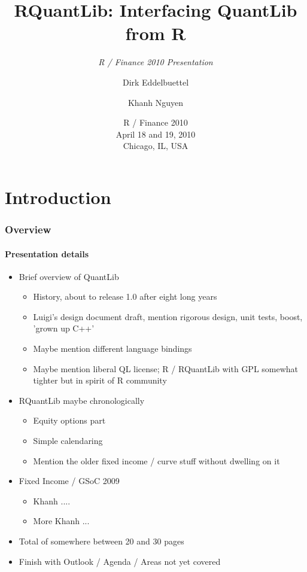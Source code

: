 \documentclass[smaller,compress, 9pt]{beamer}
\title[RQuantLib]{RQuantLib: Interfacing QuantLib from R}  %
\subtitle{\textsl{R / Finance 2010 Presentation}}
\author[Eddelbuettel \and Nguyen]{Dirk Eddelbuettel\inst{1} \and Khanh Nguyen\inst{2}}
\institute[Debian and UMASS]{
  \inst{1}%
  Debian Project
  \and 
  \inst{2}
  UMASS at Boston
}
\date[R / Finance 2010]{R / Finance 2010 \\ April 18 and 19, 2010 \\ Chicago, IL, USA}
\begin{document}
\begin{frame}
  \titlepage
\end{frame}

\section{Introduction}
\begin{frame}
  \frametitle{Overview}
  \framesubtitle{Presentation details}
  \begin{itemize}
  \item Brief overview of QuantLib
    \begin{itemize}
    \item History, about to release 1.0 after eight long years
    \item Luigi's design document draft, mention rigorous design, unit
      tests, boost, 'grown up C++'
    \item Maybe mention different language bindings
    \item Maybe mention liberal QL license; R / RQuantLib with GPL somewhat
      tighter but in spirit of R community
    \end{itemize}
  \item RQuantLib maybe chronologically
    \begin{itemize}
    \item Equity options part
    \item Simple calendaring
    \item Mention the older fixed income / curve stuff without dwelling on it
    \end{itemize}
  \item Fixed Income / GSoC 2009
    \begin{itemize}
    \item Khanh ....
    \item More Khanh ...
    \end{itemize}
  \item Total of somewhere between 20 and 30 pages
  \item Finish with Outlook / Agenda / Areas not yet covered
  \end{itemize}
\end{frame}

%
%
%
%
%
%
\end{document}
